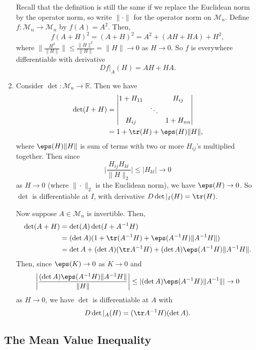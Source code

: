 \documentclass[12pt]{article}
\begin{document}
\begin{exbox}
\begin{enumerate}[1.]
			Recall that the definition is still the same if we replace the Euclidean norm by the operator norm, so write $\|\cdot\|$ for the operator norm on $\mathcal{M}_n$. Define $f : \mathcal{M}_n \to \mathcal{M}_n$ by $f(A) = A^2$. Then,
			\[
			f(A+H)^2 = (A+H)^2 = A^2 + (AH + HA) + H^2
			,\]
			where $\| \frac{H^2}{\|H\|} \| \leq \frac{\|H\|^2}{\|H\|} = \|H\| \to 0$ as $H \to 0$. So $f$ is everywhere differentiable with derivative
			\[
			Df|_A(H) = AH + HA
			.\]
		\item Consider $\det : \mathcal{M}_n \to \mathbb{R}$. Then we have
			\begin{align*}
				\det(I+H) &=
				\begin{vmatrix}
					1 + H_{11} & & H_{ij} \\
						   & \ddots & \\
					H_{ij} & & 1 + H_{nn}
				\end{vmatrix}
				\\
					  &= 1 + \tr(H) + \eps(H) \|H\|,
			\end{align*}
			where $\eps(H) \|H\|$ is sum of terms with two or more $H_{ij}$'s multiplied together. Then since
			\[
			\biggl| \frac{H_{ij}H_{kl}}{\|H\|_2}\biggr| \leq |H_{kl}| \to 0
			\]
			as $H \to 0$ (where $\|\cdot\|_2$ is the Euclidean norm), we have $\eps(H) \to 0$. So $\det$ is differentiable at $I$, with derivative $D \det|_I(H) = \tr(H)$.

			Now suppose $A \in \mathcal{M}_n$ is invertible. Then,
			\begin{align*}
				\det(A+H) &= \det(A) \det(I + A^{-1}H) \\
					  &= (\det A) (1 + \tr(A^{-1}H) + \eps(A^{-1}H)\|A^{-1}H\|) \\
					  &= \det A + (\det A)(\tr A^{-1}H) + (\det A)\eps(A^{-1}H)\|A^{-1}H\|.
			\end{align*}
			Then, since $\eps(K) \to 0$ as $K \to 0$ and
			\[
			\biggl| \frac{(\det A) \eps(A^{-1}H)\|A^{-1}H\|}{\|H\|}\biggr| \leq |(\det A)\eps(A^{-1}H)\|A^{-1}\| | \to 0
			\]
			as $H \to 0$, we have $\det$ is differentiable at $A$ with
			\[
			D \det|_A(H) = (\tr A^{-1}H)(\det A)
			.\]
	\end{enumerate}
\end{exbox}

\subsection{The Mean Value Inequality}
\label{sub:the_mean_value_inequality}
\end{document}
